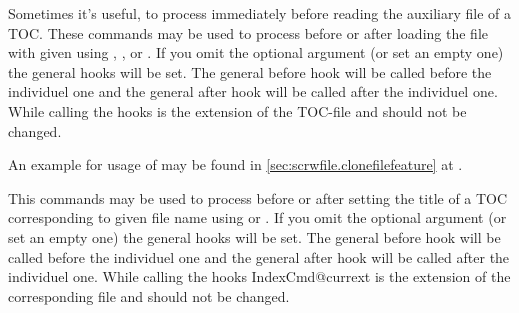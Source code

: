 \begin{Declaration}
\end{Declaration}
Sometimes it's useful, to process  immediately before
reading the auxiliary file of a TOC.  These commands may be used to process
 before or after loading the file with given
 using , , or
.  If you omit the optional argument (or set an empty
one) the general hooks will be set. The general before hook will be called
before the individuel one and the general after hook will be called after the
individuel one. While calling the hooks
 is the
extension of the TOC-file and should not be changed.

An example for usage of  may be
found in \autoref{sec:scrwfile.clonefilefeature} at
.
\EndIndexGroup


\begin{Declaration}
\end{Declaration}
This commands may be used to process  before or after
setting the title of a TOC corresponding to given file name 
using  or . If you omit the optional
argument (or set an empty one) the general hooks will be set. The general
before hook will be called before the individuel one and the general after
hook will be called after the individuel one. While calling the hooks
IndexCmd{@currext} is the
extension of the corresponding file and should not be changed.
\EndIndexGroup


